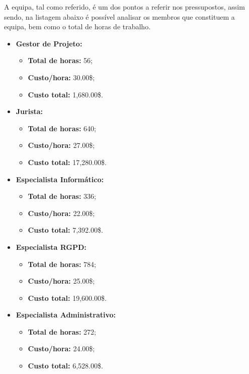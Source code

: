 A equipa, tal como referido, é um dos pontos a referir nos pressupostos, assim sendo, na listagem abaixo é possível analisar os membros que constituem a equipa, bem como o total de horas de trabalho.

\begin{itemize}
	\item \textbf{Gestor de Projeto:}
		\begin{itemize}
			\item \textbf{Total de horas:} 56;
			\item \textbf{Custo/hora:} 30.00\$;
			\item \textbf{Custo total:} 1,680.00\$.
		\end{itemize}
	\item \textbf{Jurista:}
		\begin{itemize}
			\item \textbf{Total de horas:} 640;
			\item \textbf{Custo/hora:} 27.00\$;
			\item \textbf{Custo total:} 17,280.00\$.
		\end{itemize}
	\item \textbf{Especialista Informático:}
		\begin{itemize}
			\item \textbf{Total de horas:} 336;
			\item \textbf{Custo/hora:} 22.00\$;
			\item \textbf{Custo total:} 7,392.00\$.
		\end{itemize}
	\item \textbf{Especialista RGPD:}
		\begin{itemize}
			\item \textbf{Total de horas:} 784;
			\item \textbf{Custo/hora:} 25.00\$;
			\item \textbf{Custo total:} 19,600.00\$.
		\end{itemize}
	\item \textbf{Especialista Administrativo:}
		\begin{itemize}
			\item \textbf{Total de horas:} 272;
			\item \textbf{Custo/hora:} 24.00\$;
			\item \textbf{Custo total:} 6,528.00\$.
		\end{itemize}
\end{itemize}